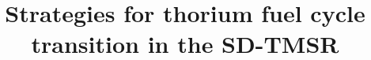 \documentclass[review]{elsarticle}
\begin{document}
\begin{frontmatter}
\title{Strategies for thorium fuel cycle transition in the SD-TMSR}

\date{}                     %




	
\begin{keyword}

\end{keyword}



\end{frontmatter}
\glsresetall

\linenumbers



\FloatBarrier

\FloatBarrier

\FloatBarrier
%

\FloatBarrier

\FloatBarrier


\newpage
\appendix

\end{document}
